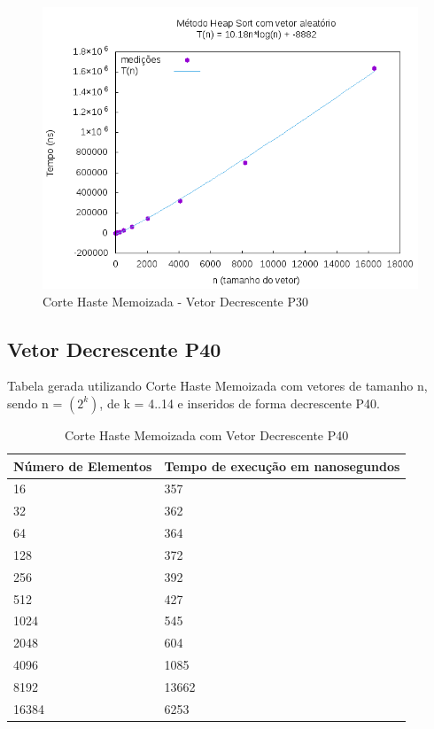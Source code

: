 \documentclass[12pt,a4paper,twoside]{report}
\begin{document}
\begin{figure}[H]
    \centering
    \includegraphics[width=0.7\linewidth]{graficos/HeapSort/vIntAleatorio/vIntAleatorio.png}
  \caption{Corte Haste Memoizada - Vetor Decrescente P30}
\end{figure}




\subsection{Vetor Decrescente P40}
Tabela gerada utilizando Corte Haste Memoizada com vetores de tamanho n, sendo n = $(2^k)$, de k = 4..14 e inseridos de forma decrescente P40.
\begin{table}[H]
\centering
\caption{Corte Haste Memoizada com Vetor Decrescente P40}
\label{my-label}
\begin{tabular}{|l|l|}
\hline
\multicolumn{1}{|c|}{\textbf{Número de Elementos}} & \multicolumn{1}{c|}{\textbf{Tempo de execução em nanosegundos}} \\ \hline
16 & 357 \\ \hline
32 & 362 \\ \hline
64 & 364 \\ \hline
128 & 372 \\ \hline
256 & 392 \\ \hline
512 & 427 \\ \hline
1024 & 545 \\ \hline
2048 & 604 \\ \hline
4096 & 1085 \\ \hline
8192 & 13662 \\ \hline
16384 & 6253 \\ \hline

\end{tabular}
\end{table}
\end{document}
